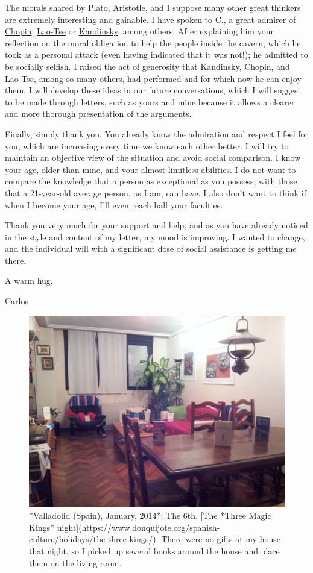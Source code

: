 \documentclass[]{book}
\begin{document}
The morals shared by Plato, Aristotle, and I suppose many other great thinkers are extremely interesting and gainable. I have spoken to C., a great admirer of \href{https://en.wikipedia.org/wiki/Fr\%C3\%A9d\%C3\%A9ric_Chopin}{Chopin}, \href{https://en.wikipedia.org/wiki/Laozi}{Lao-Tse} or \href{https://en.wikipedia.org/wiki/Wassily_Kandinsky}{Kandinsky}, among others. After explaining him your reflection on the moral obligation to help the people inside the cavern, which he took as a personal attack (even having indicated that it was not!); he admitted to be socially selfish. I raised the act of generosity that Kandinsky, Chopin, and Lao-Tse, among so many others, had performed and for which now he can enjoy them. I will develop these ideas in our future conversations, which I will suggest to be made through letters, such as yours and mine because it allows a clearer and more thorough presentation of the arguments.

Finally, simply thank you. You already know the admiration and respect I feel for you, which are increasing every time we know each other better. I will try to maintain an objective view of the situation and avoid social comparison. I know your age, older than mine, and your almost limitless abilities. I do not want to compare the knowledge that a person as exceptional as you possess, with those that a 21-year-old average person, as I am, can have. I also don't want to think if when I become your age, I'll even reach half your faculties.

Thank you very much for your support and help, and as you have already noticed in the style and content of my letter, my mood is improving. I wanted to change, and the individual will with a significant dose of social assistance is getting me there.

A warm hug.

Carlos

\begin{figure}

{\centering \includegraphics[width=0.75\linewidth]{images/2014/living} 

}

\caption{*Valladolid (Spain), January, 2014*: The 6th. [The *Three Magic Kings* night](https://www.donquijote.org/spanish-culture/holidays/the-three-kings/). There were no gifts at my house that night, so I picked up several books around the house and place them on the living room.}\label{fig:living}
\end{figure}
\end{document}
